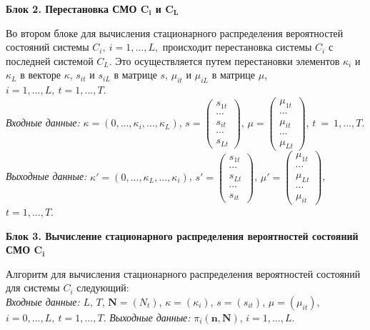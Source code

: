 \documentclass[a4paper,14pt]{extarticle}
\theoremstyle{note}
\begin{document}
\medskip
\textbf{Блок 2. Перестановка СМО $\boldsymbol{C_i}$ и $\boldsymbol{C_L}$}

Во втором блоке для вычисления стационарного распределения вероятностей состояний системы $C_i,~i=1,...,L,$ происходит перестановка системы $C_i$ с последней системой $C_L$. Это осуществляется путем перестановки элементов $\kappa_i$ и $\kappa_L$ в векторе $\kappa$, $s_{it}$ и $s_{iL}$ в матрице $s$, $\mu_{it}$ и $\mu_{iL}$ в матрице $\mu$, $i=1,...,L,~t=1,...,T$. \\
\textit{Входные данные:} $\kappa=(0,...,\kappa_i,...,\kappa_L)$, $s=\left( \begin{matrix}
s_{1t}\\
\cdots\\
s_{it}\\
\cdots\\
s_{Lt}
\end{matrix} \right )$, $\mu=\left( \begin{matrix}
\mu_{1t}\\
\cdots\\
\mu_{it}\\
\cdots\\
\mu_{Lt}
\end{matrix} \right )$, $t~=~1,...,T$. \\
\textit{Выходные данные:} $\kappa'=(0,...,\kappa_L,...,\kappa_i)$, $s'=\left( \begin{matrix}
s_{1t}\\
\cdots\\
s_{Lt}\\
\cdots\\
s_{it}
\end{matrix} \right )$, $\mu'=\left( \begin{matrix}
\mu_{1t}\\
\cdots\\
\mu_{Lt}\\
\cdots\\
\mu_{it}
\end{matrix} \right )$, $t=1,...,T$.

\medskip
\textbf{Блок 3. Вычисление стационарного распределения вероятностей состояний СМО $\boldsymbol{C_i}$}

Алгоритм для вычисления стационарного распределения вероятностей состояний для системы $C_i$ следующий:\\
\emph{Входные данные:} $L$, $T$, $\mathbf{N}=(N_t)$, $\kappa=(\kappa_i)$, $s=(s_{it})$, $\mu=(\mu_{it})$, $i=0,...,L,~t=1,...,T$.
\emph{Выходные данные:} $\pi_i(\mathbf{n},\mathbf{N})$, $i=1,...,L$.
\end{document}
